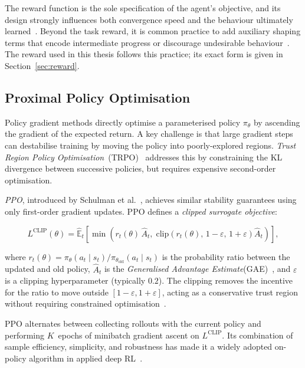 The reward function is the sole specification of the agent's objective, and its design strongly influences both convergence speed and the behaviour ultimately learned~\cite{Sutton2018ReinforcementIntroduction}. Beyond the task reward, it is common practice to add auxiliary shaping terms that encode intermediate progress or discourage undesirable behaviour~\cite{Mataric1994RewardLearning,NgPolicyShaping}. The reward used in this thesis follows this practice; its exact form is given in Section~\ref{sec:reward}.

\subsection{Proximal Policy Optimisation}
\label{sec:ppo}

Policy gradient methods directly optimise a parameterised policy $\pi_\theta$
by ascending the gradient of the expected return.  A key challenge is that
large gradient steps can destabilise training by moving the policy into
poorly-explored regions.  \emph{Trust Region Policy Optimisation}~(TRPO)~\cite{Schulman2015TrustOptimization}
addresses this by constraining the KL divergence between successive policies,
but requires expensive second-order optimisation.

\emph{\ac{PPO}}, introduced by Schulman et
al.~\cite{Schulman2017ProximalAlgorithms}, achieves similar stability
guarantees using only first-order gradient updates.  PPO defines a
\emph{clipped surrogate objective}:

\begin{equation}
\label{eq:ppo}
L^{\mathrm{CLIP}}(\theta) = \hat{\mathbb{E}}_t\!\left[
  \min\!\left(r_t(\theta)\,\hat{A}_t,\;
  \mathrm{clip}\!\left(r_t(\theta),\, 1-\varepsilon,\, 1+\varepsilon\right)
  \hat{A}_t\right)\right],
\end{equation}

where $r_t(\theta) = \pi_\theta(a_t \mid s_t) / \pi_{\theta_{\mathrm{old}}}
(a_t \mid s_t)$ is the probability ratio between the updated and old policy,
$\hat{A}_t$ is the \emph{Generalised Advantage Estimate}(GAE)~\cite{Schulman2016High-DimensionalEstimation}, and
$\varepsilon$ is a clipping hyperparameter (typically $0.2$).  The clipping
removes the incentive for the ratio to move outside
$[1-\varepsilon, 1+\varepsilon]$, acting as a conservative trust region
without requiring constrained
optimisation~\cite{Schulman2017ProximalAlgorithms}.

PPO alternates between collecting rollouts with the current policy and
performing $K$~epochs of minibatch gradient ascent on $L^{\mathrm{CLIP}}$.
Its combination of sample efficiency, simplicity, and robustness has made it
a widely adopted on-policy algorithm in applied deep
RL~\cite{Schulman2017ProximalAlgorithms,Towers2025Gymnasium:Environments}.

